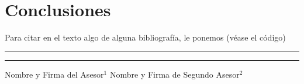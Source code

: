 \documentclass[letterpaper,12pt]{article}
\begin{document}
\section*{Conclusiones}

Para citar en el texto algo de alguna bibliografía, le ponemos
\cite{refer1} (véase el código)
     
\begin{thebibliography}{99}
    
 \fontsize{0.35cm}{0.5cm}

  \end{thebibliography}

\vspace{2cm}

\rule{75mm}{0.1mm}\hfill\rule{75mm}{0.1mm}


Nombre y Firma del Asesor$^1$ \hspace{3.5cm} Nombre y Firma de Segundo Asesor$^2$
\centering 
\end{document}
